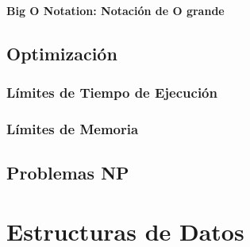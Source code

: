 \documentclass[12pt, fleqn]{report}                             %
\theoremstyle{break}                                            %
\begin{document}
            \subsection{Big O Notation: Notación de O grande}



    \clearpage
    \chapter{Optimización}

        \section{Límites de Tiempo de Ejecución}

        \section{Límites de Memoria}



    \clearpage
    \chapter{Problemas NP}


\part{Estructuras de Datos}
\end{document}
